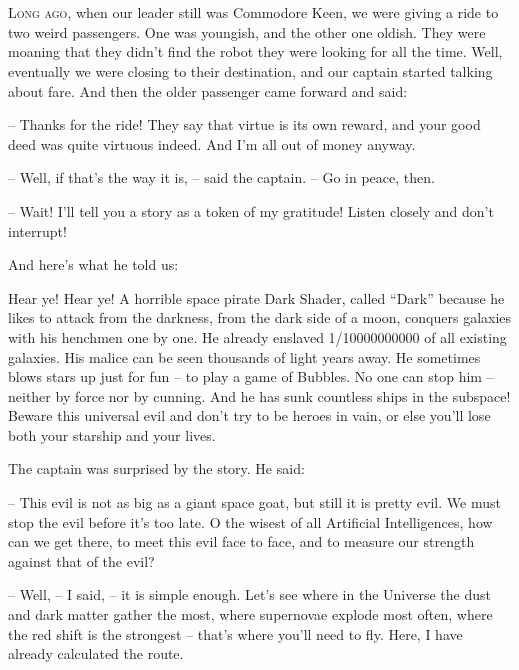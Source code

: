 \documentclass[ebook,oneside,final,openright]{memoir}
\begin{document}
\chapter{}
\par
\lettrine{L}{ong ago,} when our leader still was Commodore Keen, we were giving a ride to two weird passengers. One was youngish, and the other one oldish. They were moaning that they didn’t find the robot they were looking for all the time. Well, eventually we were closing to their destination, and our captain started talking about fare. And then the older passenger came forward and said: \par
\par
– Thanks for the ride! They say that virtue is its own reward, and your good deed was quite virtuous indeed. And I’m all out of money anyway.\par
– Well, if that’s the way it is, – said the captain. – Go in peace, then. \par
– Wait! I’ll tell you a story as a token of my gratitude! Listen closely and don’t interrupt! \par
 And here’s what he told us:\par
\par
Hear ye! Hear ye! A horrible space pirate Dark Shader, called “Dark” because he likes to attack from the darkness, from the dark side of a moon, conquers galaxies with his henchmen one by one. He already enslaved 1/10000000000 of all existing galaxies. His malice can be seen thousands of light years away. He sometimes blows stars up just for fun – to play a game of Bubbles. No one can stop him – neither by force nor by cunning. And he has sunk countless ships in the subspace! Beware this universal evil and don’t try to be heroes in vain, or else you’ll lose both your starship and your lives.\par
\par
The captain was surprised by the story. He said:\par
– This evil is not as big as a giant space goat, but still it is pretty evil. We must stop the evil before it’s too late. O the wisest of all Artificial Intelligences, how can we get there, to meet this evil face to face, and to measure our strength against that of the evil?\par
– Well, – I said, – it is simple enough. Let’s see where in the Universe the dust and dark matter gather the most, where supernovae explode most often, where the red shift is the strongest – that’s where you’ll need to fly. Here, I have already calculated the route.\par
\end{document}
